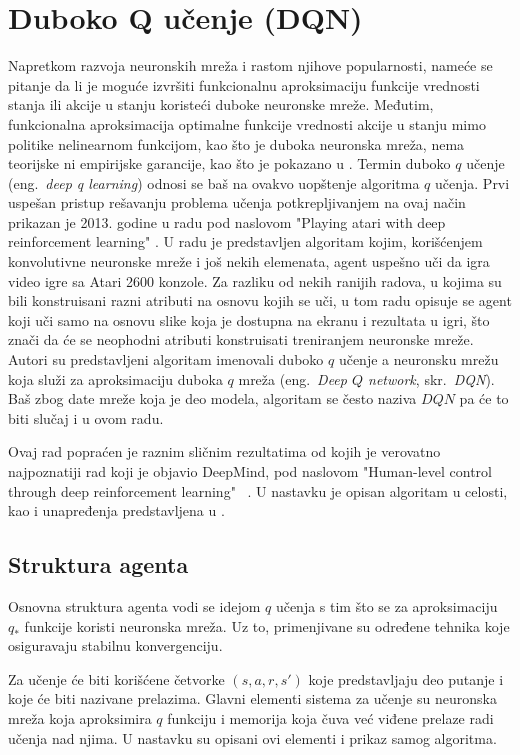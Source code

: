 \chapter{Duboko Q učenje (DQN)}
\label{ch:dqn}

Napretkom razvoja neuronskih mreža i rastom njihove popularnosti, nameće se pitanje da li je moguće izvršiti funkcionalnu aproksimaciju funkcije vrednosti stanja ili akcije u stanju koristeći duboke neuronske mreže. Međutim, funkcionalna aproksimacija optimalne funkcije vrednosti akcije u stanju mimo politike nelinearnom funkcijom, kao što je duboka neuronska mreža, nema teorijske ni empirijske garancije, kao što je pokazano u \cite{q_nn_div}.  Termin duboko $q$ učenje (eng.~{\em deep q learning}) odnosi se baš na ovakvo uopštenje algoritma $q$ učenja. Prvi uspešan pristup rešavanju problema učenja potkrepljivanjem na ovaj način prikazan je 2013. godine u radu pod naslovom "Playing atari with deep reinforcement learning" \cite{dqn_mnih}. U radu je predstavljen algoritam kojim, korišćenjem konvolutivne neuronske mreže i još nekih elemenata, agent uspešno uči da igra video igre sa Atari 2600 konzole. Za razliku od nekih ranijih radova, u kojima su bili konstruisani razni atributi na osnovu kojih se uči, u tom radu opisuje se agent koji uči samo na osnovu slike koja je dostupna na ekranu i rezultata u igri, što znači da će se neophodni atributi konstruisati treniranjem neuronske mreže. 
Autori su predstavljeni algoritam imenovali duboko $q$ učenje a neuronsku mrežu koja služi za aproksimaciju duboka $q$ mreža (eng.~{\em Deep $Q$ network}, skr.~{\em DQN}). Baš zbog date mreže koja je deo modela, algoritam se često naziva $DQN$ pa će to biti slučaj i u ovom radu.
\par 
Ovaj rad popraćen je raznim sličnim rezultatima od kojih je verovatno najpoznatiji rad koji je objavio DeepMind, pod naslovom "Human-level control through deep reinforcement learning" ~\cite{dqn_dm}.  U nastavku je opisan algoritam u celosti, kao i unapređenja predstavljena u \cite{dqn_dm}.

\section{Struktura agenta}

Osnovna struktura agenta vodi se idejom $q$ učenja s tim što se za aproksimaciju $q_*$ funkcije koristi neuronska mreža. Uz to, primenjivane su određene tehnika koje osiguravaju stabilnu konvergenciju. 
\par 
Za učenje će biti korišćene četvorke $(s, a, r, s')$ koje predstavljaju deo putanje i koje će biti nazivane prelazima. Glavni elementi sistema za učenje su neuronska mreža koja aproksimira $q$ funkciju i memorija koja čuva već viđene prelaze radi učenja nad njima. U nastavku su opisani ovi elementi i prikaz samog algoritma.

